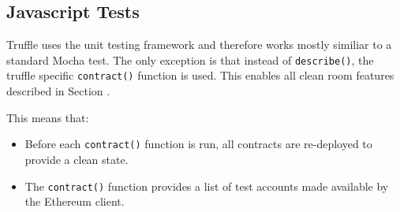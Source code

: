 \subsection{Javascript Tests}\label{sec:jsTest}

Truffle uses the  unit testing framework and therefore works mostly similiar to a standard Mocha test. The only exception is that instead of \lstinline{describe()}, the truffle specific \lstinline{contract()} function is used. This enables all clean room features described in Section . 

This means that:
\begin{itemize}
    \item Before each \lstinline{contract()} function is run, all contracts are re-deployed to provide a clean state.
    \item The \lstinline{contract()} function provides a list of test accounts made available by the Ethereum client.
\end{itemize}

